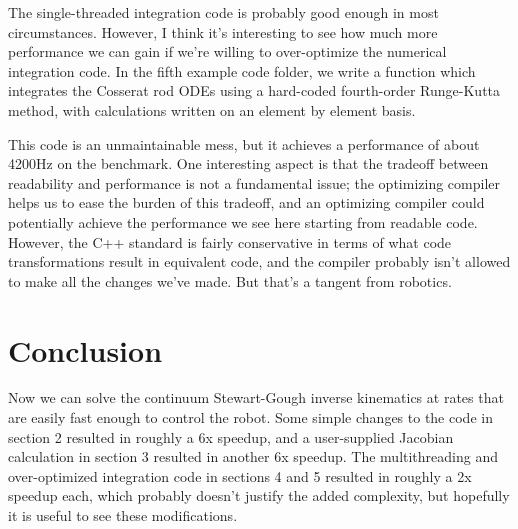 \documentclass[12pt]{article}
\begin{document}
The single-threaded integration code is probably good enough in most circumstances. However, I think it's interesting to see how much more performance we can gain if we're willing to over-optimize the numerical integration code. In the fifth example code folder, we write a function which integrates the Cosserat rod ODEs using a hard-coded fourth-order Runge-Kutta method, with calculations written on an element by element basis.

This code is an unmaintainable mess, but it achieves a performance of about 4200Hz on the benchmark. One interesting aspect is that the tradeoff between readability and performance is not a fundamental issue; the optimizing compiler helps us to ease the burden of this tradeoff, and an optimizing compiler could potentially achieve the performance we see here starting from readable code. However, the C++ standard is fairly conservative in terms of what code transformations result in equivalent code, and the compiler probably isn't allowed to make all the changes we've made. But that's a tangent from robotics.

\section{Conclusion}

Now we can solve the continuum Stewart-Gough inverse kinematics at rates that are easily fast enough to control the robot. Some simple changes to the code in section 2 resulted in roughly a 6x speedup, and a user-supplied Jacobian calculation in section 3 resulted in another 6x speedup. The multithreading and over-optimized integration code in sections 4 and 5 resulted in roughly a 2x speedup each, which probably doesn't justify the added complexity, but hopefully it is useful to see these modifications.
\end{document}

